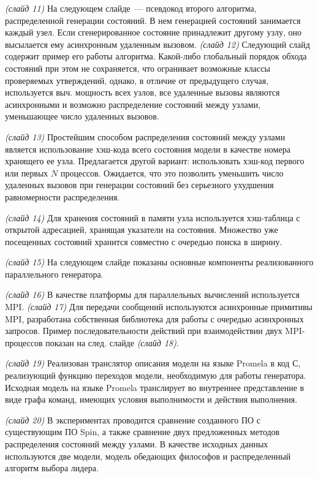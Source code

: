 \documentclass[a4paper,12pt,notitlepage]{article}
\begin{document}
\emph{(слайд 11)} На следующем слайде~--- псевдокод второго алгоритма, распределенной
генерации состояний. В нем генерацией состояний занимается каждый узел. Если
сгенерированное состояние принадлежит другому узлу, оно высылается ему асинхронным
удаленным вызовом. \emph{(слайд 12)} Следующий слайд содержит пример его работы
алгоритма. Какой-либо глобальный порядок обхода состояний при этом не сохраняется, что
огранивает возможные классы проверяемых утверждений, однако, в отличие от предыдущего
случая, используется выч. мощность всех узлов, все удаленные вызовы являются асинхронными
и возможно распределение состояний между узлами, уменьшающее число удаленных вызовов.

\emph{(слайд 13)} Простейшим способом распределения состояний между узлами является
использование хэш-кода всего состояния модели в качестве номера хранящего ее
узла. Предлагается другой вариант: использовать хэш-код первого или первых $N$
процессов. Ожидается, что это позволить уменьшить число удаленных вызовов при генерации
состояний без серьезного ухудшения равномерности распределения.

\emph{(слайд 14)} Для хранения состояний в памяти узла используется хэш-таблица с открытой
адресацией, хранящая указатели на состояния. Множество уже посещенных состояний хранится
совместно с очередью поиска в ширину.

\emph{(слайд 15)} На следующем слайде показаны основные компоненты реализованного
параллельного генератора.

\emph{(слайд 16)} В качестве платформы для параллельных вычислений используется MPI.
\emph{(слайд 17)} Для передачи сообщений используются асинхронные примитивы MPI,
разработана собственная библиотека для работы с очередью асинхронных
запросов. Пример последовательности действий при взаимодействии двух MPI-процессов показан
на след. слайде \emph{(слайд 18)}.

\emph{(слайд 19)} Реализован транслятор описания модели на языке Promela в код С,
реализующий функцию переходов модели, необходимую для работы генератора. Исходная модель
на языке Promela транслирует во внутреннее представление в виде графа команд, имеющих
условия выполнимости и действия выполнения.

\emph{(слайд 20)} В экспериментах проводится сравнение созданного ПО с существующим ПО
Spin, а также сравнение двух предложенных методов распределения состояний между узлами. В
качестве исходных данных используются две модели, модель обедающих философов и
распределенный алгоритм выбора лидера.
\end{document}
